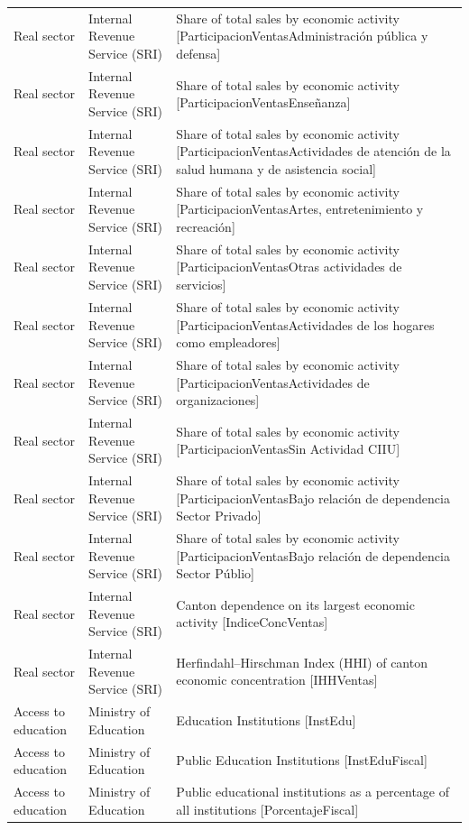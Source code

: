 \documentclass[10pt,a4paper]{article}
\begin{document}
\begin{longtable}{@{}>{\raggedright\arraybackslash}p{3.5cm}>{\raggedright\arraybackslash}p{5.6cm}>{\raggedright\arraybackslash}p{\dimexpr\textwidth-9.1cm-4\tabcolsep\relax}@{}}
Real sector & Internal Revenue Service (SRI) & Share of total sales by economic activity [ParticipacionVentasAdministraci\'{o}n p\'{u}blica y defensa]\\
Real sector & Internal Revenue Service (SRI) & Share of total sales by economic activity [ParticipacionVentasEnse\~{n}anza]\\
Real sector & Internal Revenue Service (SRI) & Share of total sales by economic activity [ParticipacionVentasActividades de atenci\'{o}n de la salud humana y de asistencia social]\\
Real sector & Internal Revenue Service (SRI) & Share of total sales by economic activity [ParticipacionVentasArtes, entretenimiento y recreaci\'{o}n]\\
Real sector & Internal Revenue Service (SRI) & Share of total sales by economic activity [ParticipacionVentasOtras actividades de servicios]\\
Real sector & Internal Revenue Service (SRI) & Share of total sales by economic activity [ParticipacionVentasActividades de los hogares como empleadores]\\
Real sector & Internal Revenue Service (SRI) & Share of total sales by economic activity [ParticipacionVentasActividades de organizaciones]\\
Real sector & Internal Revenue Service (SRI) & Share of total sales by economic activity [ParticipacionVentasSin Actividad CIIU]\\
Real sector & Internal Revenue Service (SRI) & Share of total sales by economic activity [ParticipacionVentasBajo relaci\'{o}n de dependencia Sector Privado]\\
Real sector & Internal Revenue Service (SRI) & Share of total sales by economic activity [ParticipacionVentasBajo relaci\'{o}n de dependencia Sector P\'{u}blio]\\
Real sector & Internal Revenue Service (SRI) & Canton dependence on its largest economic activity [IndiceConcVentas]\\
Real sector & Internal Revenue Service (SRI) & Herfindahl--Hirschman Index (HHI) of canton economic concentration [IHHVentas]\\
Access to education & Ministry of Education & Education Institutions [InstEdu]\\
Access to education & Ministry of Education & Public Education Institutions [InstEduFiscal]\\
Access to education & Ministry of Education & Public educational institutions as a percentage of all institutions [PorcentajeFiscal]\\

\end{longtable}
\end{document}
